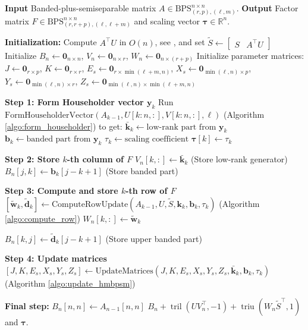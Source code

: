 \documentclass[a4paper,fleqn]{cas-sc}
\def\BPS{{\mathrm{BPS}}_{(r,p),(\ell,m)}^{n \times n}}
\def\bfy{{\mathbf y}}
\def\bfw{{\mathbf w}}
\DeclareMathOperator{\triu}{triu}
\DeclareMathOperator{\tril}{tril}
\begin{document}
\begin{algorithm}[H]
\caption{Fast QR Factorization for BPS Matrices}
\label{algo:fastqr}
\begin{algorithmic}
\State \textbf{Input} Banded-plus-semiseparable matrix $A \in \BPS$.
\State \textbf{Output} Factor matrix $F \in {\mathrm{BPS}}_{(r,r+p),(\ell,\ell+m)}^{n \times n}$ and scaling vector
$\boldsymbol{\tau} \in \mathbb{R}^{n}$.

\State \textbf{Initialization:}
\State Compute $A^\top U$ in $O(n)$, see \cite{chandrasekaran2002fast}, and set $\tilde S \gets \begin{bmatrix} S & A^\top U
\end{bmatrix}$ 
\State Initialize $B_n \gets \mathbf{0}_{n \times n}$, $V_n \gets \mathbf{0}_{n \times r}$, $W_n \gets \mathbf{0}_{n \times (r+p)}$
\State Initialize parameter matrices: $J \gets \mathbf{0}_{r \times p}$, $K \gets \mathbf{0}_{r \times r}$, $E_s \gets \mathbf{0}_{r \times \min(\ell+m,n)}$, $X_s \gets \mathbf{0}_{\min(\ell,n) \times p}$, $Y_s \gets \mathbf{0}_{\min(\ell,n) \times r}$, $Z_s \gets \mathbf{0}_{\min(\ell,n) \times \min(\ell+m,n)}$

    \State \textbf{Step 1: Form Householder vector $\bfy_k$}
    \State Run $ \text{FormHouseholderVector}(A_{k-1}, U[k:n, :], V[k:n, :], \ell)$ (Algorithm \ref{algo:form_householder}) to get:
    \State $\bar{\mathbf{k}}_{k} \gets \text{low-rank part from } \mathbf{y}_k$
    \State $\mathbf{b}_{k} \gets \text{banded part from } \bfy_k$
    \State $\tau_k \gets \text{scaling coefficient}$
    \State $\boldsymbol{\tau}[k] \gets \tau_k$

    \State \textbf{Step 2: Store $k$-th column of $F$}
    \State $V_n[k, :] \gets \bar{\mathbf{k}}_{k}$ (Store low-rank generator)
        \State $B_n[j, k] \gets \mathbf{b}_{k}[j-k+1]$ (Store banded part)
    \EndFor

    \State \textbf{Step 3: Compute and store $k$-th row of $F$}
    \State $[\tilde \bfw_k, \tilde{\mathbf{d}}_k] \gets \text{ComputeRowUpdate}(A_{k-1}, U, \tilde S, \mathbf{k}_{k}, \mathbf{b}_{k}, \tau_k)$ (Algorithm \ref{algo:compute_row})
    \State $W_n[k, :] \gets \tilde \bfw_k$
    
        \State $B_n[k, j] \gets \tilde{\mathbf{d}}_{k}[j-k+1]$ (Store upper banded part)
    \EndFor

    \State \textbf{Step 4: Update matrices}
    \State $[J, K, E_s, X_s, Y_s, Z_s] \gets \text{UpdateMatrices}(J, K, E_s, X_s, Y_s, Z_s, \bar{\mathbf{k}}_{k}, \mathbf{b}_{k}, \tau_k)$ (Algorithm \ref{algo:update_hmbpsm})
\EndFor

\State \textbf{Final step:}
\State $B_n[n, n] \gets A_{n-1}[n, n]$
\State \Return $B_n + \tril(UV_n^\top,-1) + \triu(W_n \tilde S^\top,1)$ and  $\boldsymbol{\tau}$.
\end{algorithmic}
\end{algorithm}
\end{document}
